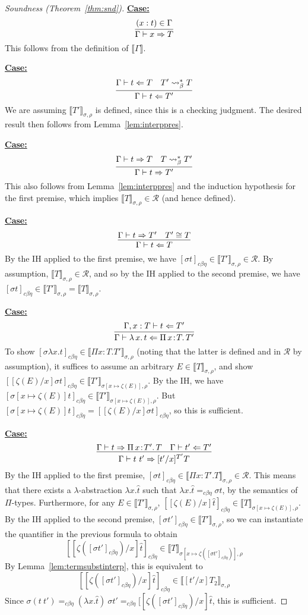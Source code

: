 \documentclass{article}
\newcommand{\choice}[0]{\zeta}
\newcommand{\abs}[4]{{#1}\, #2\! : \! #3.\, #4}
\newcommand{\absu}[3]{{#1}\, #2.\, #3}
\newcommand{\interp}[1]{\llbracket #1 \rrbracket}
\newcommand{\tpcheck}[0]{\Leftarrow}
\newcommand{\tpsynth}[0]{\Rightarrow}
\newcommand{\cbe}[0]{c\beta\eta}
\newcommand{\startcase}[1]{\vspace{#1} \noindent\textbf{\underline{Case:}}}
\begin{document}
\begin{proof}[Soundness (Theorem~\ref{thm:snd})]
\startcase{.2cm}
\[
    \infer{\Gamma\vdash x\tpsynth T}{(x : t)\in\Gamma} 
\]
This follows from the definition of $\interp{\Gamma}$.

\startcase{.2cm}
\[
 \infer{\Gamma\vdash t\tpcheck T'}{\Gamma\vdash t \tpcheck T & T' \leadsto^*_\beta T} 
\]
We are assuming $\interp{T'}_{\sigma,\rho}$ is defined, since this is a checking judgment. The desired result then
follows from Lemma~\ref{lem:interppres}.

\startcase{.2cm}
\[
    \infer{\Gamma\vdash t\tpsynth T'}{\Gamma\vdash t \tpsynth T & T \leadsto^*_\beta T'} 
\]
This also follows from Lemma~\ref{lem:interppres} and the induction hypothesis for the first premise,
which implies $\interp{T}_{\sigma,\rho}\in\mathcal{R}$ (and hence defined).

\startcase{.2cm}
\[
\infer{\Gamma\vdash t\tpcheck T}{\Gamma\vdash t\tpsynth T' & T' \cong T} 
\]
By the IH applied to the first premise, we have 
$[\sigma t]_{\cbe}\in\interp{T'}_{\sigma,\rho}\in\mathcal{R}$. By assumption, $\interp{T}_{\sigma,\rho}\in\mathcal{R}$,
and so by the IH applied to the second premise, we have $[\sigma t]_{\cbe}\in\interp{T'}_{\sigma,\rho} = \interp{T}_{\sigma,\rho}$.


\startcase{.2cm}
\[
    \infer{\Gamma\vdash \absu{\lambda}{x}{t} \tpcheck \abs{\Pi}{x}{T}{T'}}{\Gamma,x:T\vdash t\tpcheck T'} 
\]
To show $[\sigma \lambda x.t]_{\cbe}\in\interp{\Pi  x:T.T'}_{\sigma,\rho}$ (noting that the latter is defined
and in $\mathcal{R}$ by assumption), it suffices to assume an arbitrary
$E\in\interp{T}_{\sigma,\rho}$, and show
$[[\choice(E)/x]\sigma t]_{\cbe}\in\interp{T'}_{\sigma[x\mapsto\choice(E)],\rho}$.  By the IH,
we have
$[\sigma[x\mapsto\choice(E)]t]_{\cbe}\in\interp{T'}_{\sigma[x\mapsto\choice(E)],\rho}$.
But $[\sigma[x\mapsto\choice(E)]t]_{\cbe} = [[\choice(E)/x]\sigma t]_{\cbe}$,
so this is sufficient.

\startcase{.2cm}
\[
    \infer{\Gamma\vdash t\ t' \tpsynth [t'/x]^{T'} T}{\Gamma\vdash t \tpsynth \abs{\Pi}{x}{T'}{T} & \Gamma\vdash t' \tpcheck T'} 
\]
By the IH applied to the first premise, $[\sigma
t]_{\cbe}\in\interp{\Pi x:T'.T}_{\sigma,\rho}\in\mathcal{R}$.  This
means that there exists a $\lambda$-abstraction $\lambda x.\hat{t}$
such that $\lambda x.\hat{t} =_{\cbe} \sigma t$, by the semantics of $\Pi$-types.
Furthermore, for any $E\in\interp{T'}_{\sigma,\rho}$,
$[[\choice(E)/x]\hat{t}]_{\cbe}\in\interp{T}_{\sigma[x\mapsto\choice(E)],\rho}$.
By the IH applied to the second premise, $[\sigma t']_{\cbe}\in\interp{T'}_{\sigma,\rho}$,
so we can instantiate the quantifier in the previous formula to obtain
\[
 [[\choice([\sigma t']_{\cbe})/x]\hat{t}]_{\cbe}\in\interp{T}_{\sigma[x\mapsto\choice([\sigma t']_{\cbe})],\rho}
\]
By Lemma~\ref{lem:termsubstinterp}, this is equivalent to
\[
 [[\choice([\sigma t']_{\cbe})/x]\hat{t}]_{\cbe}\in\interp{[t'/x]T_2}_{\sigma,\rho}
\]
Since $\sigma (t\ t') =_{\cbe} (\lambda x.\hat{t})\ \sigma t' =_{\cbe} [[\choice([\sigma t']_{\cbe})/x]\hat{t}$,
this is sufficient.


\end{proof}
\end{document}

